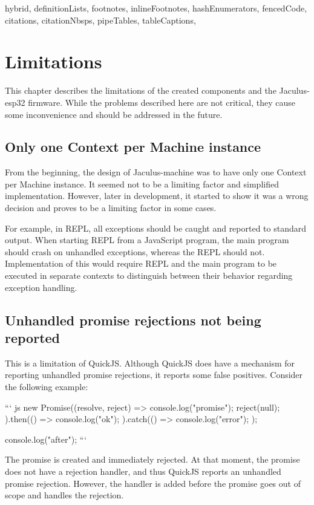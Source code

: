 \begin{markdown*}{%
  hybrid,
  definitionLists,
  footnotes,
  inlineFootnotes,
  hashEnumerators,
  fencedCode,
  citations,
  citationNbsps,
  pipeTables,
  tableCaptions,
}

\chapter{Limitations}

This chapter describes the limitations of the created components and the Jaculus-esp32 firmware. While the problems described here are not critical, they cause some inconvenience and should be addressed in the future.

\section{Only one Context per Machine instance}

From the beginning, the design of Jaculus-machine was to have only one Context per Machine instance. It seemed not to be a limiting factor and simplified implementation. However, later in development, it started to show it was a wrong decision and proves to be a limiting factor in some cases.

For example, in REPL, all exceptions should be caught and reported to standard output. When starting REPL from a JavaScript program, the main program should crash on unhandled exceptions, whereas the REPL should not. Implementation of this would require REPL and the main program to be executed in separate contexts to distinguish between their behavior regarding exception handling.


\section{Unhandled promise rejections not being reported}

This is a limitation of QuickJS. Although QuickJS does have a mechanism for reporting unhandled promise rejections, it reports some false positives. Consider the following example:

``` js
new Promise((resolve, reject) => {
  console.log("promise");
  reject(null);
}).then(() => {
  console.log("ok");
}).catch(() => {
  console.log("error");
});

console.log("after");
```

The promise is created and immediately rejected. At that moment, the promise does not have a rejection handler, and thus QuickJS reports an unhandled promise rejection. However, the handler is added before the promise goes out of scope and handles the rejection.


\end{markdown*}
